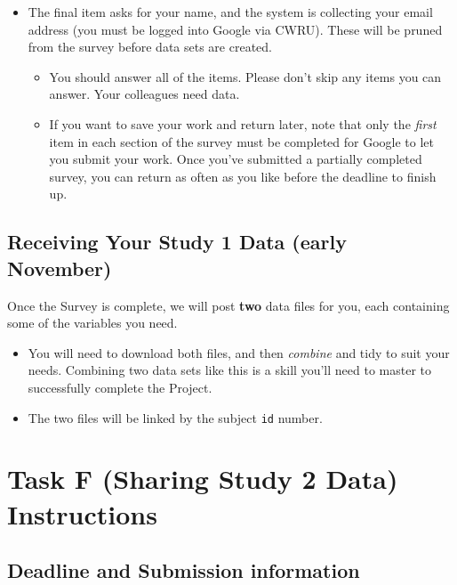\documentclass[]{book}
\providecommand{\tightlist}{%
  \setlength{\itemsep}{0pt}\setlength{\parskip}{0pt}}
\theoremstyle{definition}
\theoremstyle{definition}
\theoremstyle{definition}
\theoremstyle{remark}
\begin{document}
\begin{itemize}
\tightlist
\item
  The final item asks for your name, and the system is collecting your
  email address (you must be logged into Google via CWRU). These will be
  pruned from the survey before data sets are created.

  \begin{itemize}
  \tightlist
  \item
    You should answer all of the items. Please don't skip any items you
    can answer. Your colleagues need data.
  \item
    If you want to save your work and return later, note that only the
    \emph{first} item in each section of the survey must be completed
    for Google to let you submit your work. Once you've submitted a
    partially completed survey, you can return as often as you like
    before the deadline to finish up.
  \end{itemize}
\end{itemize}

\hypertarget{receiving-your-study-1-data-early-november}{%
\section{Receiving Your Study 1 Data (early
November)}\label{receiving-your-study-1-data-early-november}}

Once the Survey is complete, we will post \textbf{two} data files for
you, each containing some of the variables you need.

\begin{itemize}
\tightlist
\item
  You will need to download both files, and then \emph{combine} and tidy
  to suit your needs. Combining two data sets like this is a skill
  you'll need to master to successfully complete the Project.
\item
  The two files will be linked by the subject \texttt{id} number.
\end{itemize}

\hypertarget{taskF}{%
\chapter{Task F (Sharing Study 2 Data) Instructions}\label{taskF}}

\hypertarget{deadline-and-submission-information-5}{%
\section{Deadline and Submission
information}\label{deadline-and-submission-information-5}}
\end{document}
